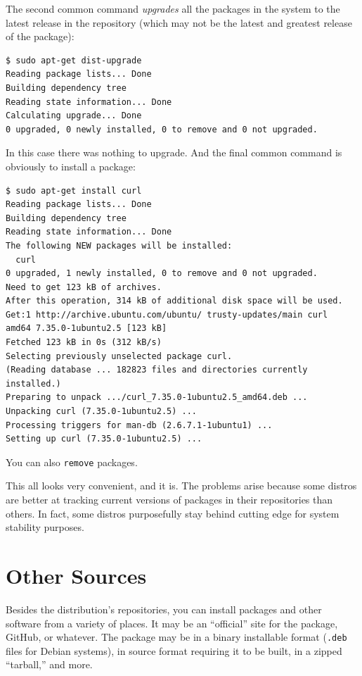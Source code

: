 \documentclass[10pt,]{book}
\numberwithin{figure}{chapter}
\begin{document}
The second common command \emph{upgrades} all the packages in the system
to the latest release in the repository (which may not be the latest and
greatest release of the package):

\begin{verbatim}
$ sudo apt-get dist-upgrade
Reading package lists... Done
Building dependency tree       
Reading state information... Done
Calculating upgrade... Done
0 upgraded, 0 newly installed, 0 to remove and 0 not upgraded.
\end{verbatim}

In this case there was nothing to upgrade. And the final common command
is obviously to install a package:

\begin{verbatim}
$ sudo apt-get install curl
Reading package lists... Done
Building dependency tree       
Reading state information... Done
The following NEW packages will be installed:
  curl
0 upgraded, 1 newly installed, 0 to remove and 0 not upgraded.
Need to get 123 kB of archives.
After this operation, 314 kB of additional disk space will be used.
Get:1 http://archive.ubuntu.com/ubuntu/ trusty-updates/main curl
amd64 7.35.0-1ubuntu2.5 [123 kB]
Fetched 123 kB in 0s (312 kB/s)
Selecting previously unselected package curl.
(Reading database ... 182823 files and directories currently installed.)
Preparing to unpack .../curl_7.35.0-1ubuntu2.5_amd64.deb ...
Unpacking curl (7.35.0-1ubuntu2.5) ...
Processing triggers for man-db (2.6.7.1-1ubuntu1) ...
Setting up curl (7.35.0-1ubuntu2.5) ...
\end{verbatim}

You can also \texttt{remove} packages.

This all looks very convenient, and it is. The problems arise because
some distros are better at tracking current versions of packages in
their repositories than others. In fact, some distros purposefully stay
behind cutting edge for system stability purposes.

\section{Other Sources}\label{other-sources}

Besides the distribution's repositories, you can install packages and
other software from a variety of places. It may be an ``official'' site
for the package, GitHub, or whatever. The package may be in a binary
installable format (\texttt{.deb} files for Debian systems), in source
format requiring it to be built, in a zipped ``tarball,'' and more.
\end{document}

